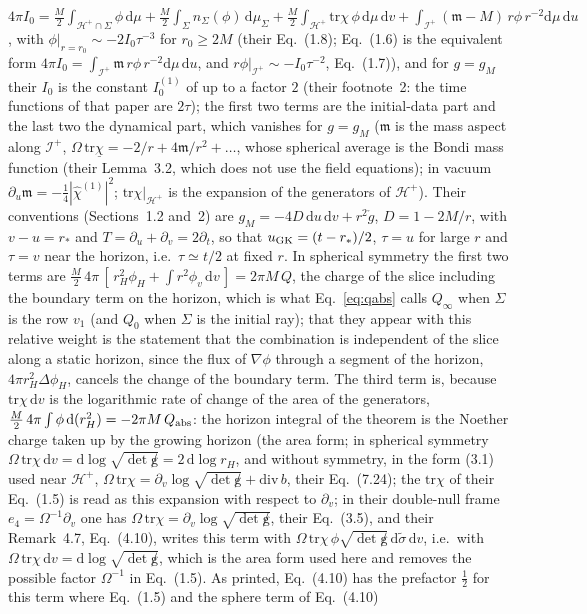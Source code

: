 \documentclass[11pt]{article}
\begin{document}
$4\pi I_0=\tfrac M2\int_{\mathcal H^{+}\cap\Sigma}\phi\,\mathrm d\mu+\tfrac M2\int_{\Sigma}n_\Sigma(\phi)\,\mathrm d\mu_\Sigma+\tfrac M2\int_{\mathcal H^{+}}\mathrm{tr}\chi\,\phi\,\mathrm d\mu\,\mathrm dv+\int_{\mathcal I^{+}}(\mathfrak m-M)\,r\phi\,r^{-2}\mathrm d\mu\,\mathrm du$,
with $\phi|_{r=r_0}\sim-2I_0\tau^{-3}$ for $r_0\ge2M$ (their Eq.~(1.8); Eq.~(1.6) is the equivalent form $4\pi I_0=\int_{\mathcal I^{+}}\mathfrak m\,r\phi\,r^{-2}\mathrm d\mu\,\mathrm du$, and $r\phi|_{\mathcal I^{+}}\sim-I_0\tau^{-2}$, Eq.~(1.7)), and for $g=g_M$ their $I_0$ is the constant $I_0^{(1)}$ of \citet{AngelopoulosAretakisGajic2018} up to a factor $2$ (their footnote~2: the time functions of that paper are $2\tau$); the first two terms are the initial-data part and the last two the dynamical part, which vanishes for $g=g_M$ ($\mathfrak m$ is the mass aspect along $\mathcal I^{+}$, $\Omega\,\mathrm{tr}\underline\chi=-2/r+4\mathfrak m/r^{2}+\dots$, whose spherical average is the Bondi mass function (their Lemma~3.2, which does not use the field equations); in vacuum $\partial_u\mathfrak m=-\tfrac14|\hat\chi^{(1)}|^{2}$; $\mathrm{tr}\chi|_{\mathcal H^{+}}$ is the expansion of the generators of $\mathcal H^{+}$). Their conventions (Sections~1.2 and~2) are $g_M=-4D\,\mathrm du\,\mathrm dv+r^{2}\mathring g$, $D=1-2M/r$, with $v-u=r_*$ and $T=\partial_u+\partial_v=2\partial_t$, so that $u_{\rm GK}=(t-r_*)/2$, $\tau=u$ for large $r$ and $\tau=v$ near the horizon, i.e.\ $\tau\simeq t/2$ at fixed $r$. In spherical symmetry the first two terms are $\tfrac M2\,4\pi\,[\,r_H^{2}\phi_H+\int r^{2}\phi_v\,\mathrm dv\,]=2\pi M\,Q$, the charge of the slice including the boundary term on the horizon, which is what Eq.~\eqref{eq:qabs} calls $Q_\infty$ when $\Sigma$ is the row $v_1$ (and $Q_0$ when $\Sigma$ is the initial ray); that they appear with this relative weight is the statement that the combination is independent of the slice along a static horizon, since the flux of $\nabla\phi$ through a segment of the horizon, $4\pi r_H^{2}\Delta\phi_H$, cancels the change of the boundary term. The third term is, because $\mathrm{tr}\chi\,\mathrm dv$ is the logarithmic rate of change of the area of the generators, $\tfrac M2\,4\pi\int\phi\,\mathrm d(r_H^{2})=-2\pi M\,Q_{\rm abs}$: the horizon integral of the theorem is the Noether charge taken up by the growing horizon (the area form; in spherical symmetry $\Omega\,\mathrm{tr}\chi\,\mathrm dv=\mathrm d\log\sqrt{\det\not g}=2\,\mathrm d\log r_H$, and without symmetry, in the form (3.1) used near $\mathcal H^{+}$, $\Omega\,\mathrm{tr}\chi=\partial_v\log\sqrt{\det\not g}+\mathrm{div}\,b$, their Eq.~(7.24); the $\mathrm{tr}\chi$ of their Eq.~(1.5) is read as this expansion with respect to $\partial_v$; in their double-null frame $e_4=\Omega^{-1}\partial_v$ one has $\Omega\,\mathrm{tr}\chi=\partial_v\log\sqrt{\det\not g}$, their Eq.~(3.5), and their Remark~4.7, Eq.~(4.10), writes this term with $\Omega\,\mathrm{tr}\chi\,\phi\sqrt{\det\not g}\,\mathrm d\tilde\sigma\,\mathrm dv$, i.e.\ with $\Omega\,\mathrm{tr}\chi\,\mathrm dv=\mathrm d\log\sqrt{\det\not g}$, which is the area form used here and removes the possible factor $\Omega^{-1}$ in Eq.~(1.5). As printed, Eq.~(4.10) has the prefactor $\tfrac12$ for this term where Eq.~(1.5) and the sphere term of Eq.~(4.10) 
\end{document}
